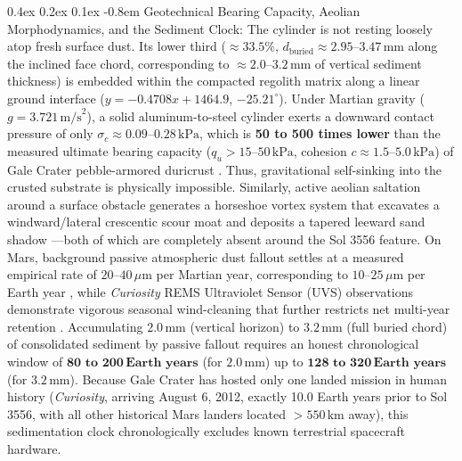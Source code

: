 \documentclass[11pt,a4paper]{article}
\makeatletter
\renewcommand\paragraph{\@startsection{paragraph}{4}{\z@}%
                                    {0.4ex \@plus 0.2ex \@minus 0.1ex}%
                                    {-0.8em}%
                                    {\normalfont\normalsize\bfseries}}
\makeatother
\begin{document}
\paragraph{Geotechnical Bearing Capacity, Aeolian Morphodynamics, and the Sediment Clock:} The cylinder is not resting loosely atop fresh surface dust. Its lower third ($\approx 33.5\%$, $d_{\text{buried}} \approx 2.95\text{--}3.47\,\text{mm}$ along the inclined face chord, corresponding to $\approx 2.0\text{--}3.2\,\text{mm}$ of vertical sediment thickness) is embedded within the compacted regolith matrix along a linear ground interface ($y = -0.4708x + 1464.9$, $-25.21^\circ$). Under Martian gravity ($g = 3.721\,\text{m/s}^2$), a solid aluminum-to-steel cylinder exerts a downward contact pressure of only $\sigma_c \approx 0.09\text{--}0.28\,\text{kPa}$, which is \textbf{50 to 500 times lower} than the measured ultimate bearing capacity ($q_u > 15\text{--}50\,\text{kPa}$, cohesion $c \approx 1.5\text{--}5.0\,\text{kPa}$) of Gale Crater pebble-armored duricrust \cite{arvidson2014}. Thus, gravitational self-sinking into the crusted substrate is physically impossible. Similarly, active aeolian saltation around a surface obstacle generates a horseshoe vortex system that excavates a windward/lateral crescentic scour moat and deposits a tapered leeward sand shadow \cite{sullivan2022}---both of which are completely absent around the Sol 3556 feature. On Mars, background passive atmospheric dust fallout settles at a measured empirical rate of $20\text{--}40\,\mu\text{m}$ per Martian year, corresponding to $10\text{--}25\,\mu\text{m}$ per Earth year \cite{kinch2015,lorenz2021,landis2000}, while \textit{Curiosity} REMS Ultraviolet Sensor (UVS) observations demonstrate vigorous seasonal wind-cleaning that further restricts net multi-year retention \cite{vicente2018,vicente2023}. Accumulating $2.0\,\text{mm}$ (vertical horizon) to $3.2\,\text{mm}$ (full buried chord) of consolidated sediment by passive fallout requires an honest chronological window of $\mathbf{80\text{ to } 200\,\text{Earth years}}$ (for $2.0\,\text{mm}$) up to $\mathbf{128\text{ to } 320\,\text{Earth years}}$ (for $3.2\,\text{mm}$). Because Gale Crater has hosted only one landed mission in human history (\textit{Curiosity}, arriving August 6, 2012, exactly 10.0 Earth years prior to Sol 3556, with all other historical Mars landers located $>550\,\text{km}$ away), this sedimentation clock chronologically excludes known terrestrial spacecraft hardware.
\end{document}
